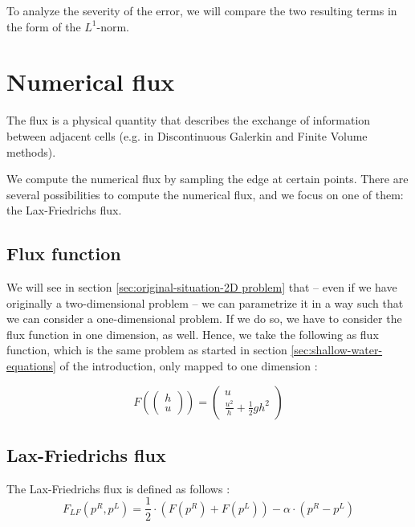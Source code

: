 \documentclass[a4paper, twoside]{article}
\begin{document}
To analyze the severity of the error, we will compare the two resulting terms in the form of the $L^1$-norm.

\section{Numerical flux}
\label{sec:numerical-flux}

The flux is a physical quantity that describes the exchange of information between adjacent cells (e.g. in Discontinuous Galerkin and Finite Volume methods).

We compute the numerical flux by sampling the edge at certain points. There are several possibilities to compute the numerical flux, and we focus on one of them: the Lax-Friedrichs flux.

\subsection{Flux function}
\label{sec:flux-function-intro}

We will see in section \ref{sec:original-situation-2D problem} that -- even if we have originally a two-dimensional problem -- we can parametrize it in a way such that we can consider a one-dimensional problem. If we do so, we have to consider the flux function in one dimension, as well. Hence, we take the following as flux function, which is the same problem as started in section \ref{sec:shallow-water-equations} of the introduction, only mapped to one dimension \cite{george2004numerical}:

\begin{equation}
  \label{eq:flux-function-definition}
  F\left(
    \begin{pmatrix}
      h \\ u
    \end{pmatrix}
  \right) =
  \begin{pmatrix}
    u \\
    \frac{u^2}{h} + \frac{1}{2} g h^2
  \end{pmatrix}
\end{equation}

\subsection{Lax-Friedrichs flux}
\label{sec:lax-friedrich-definition}

The Lax-Friedrichs flux is defined as follows \cite{leveque2002finite}:
\begin{equation}
  \label{eq:lax-friedrich-definition}
  F_{LF}(p^R,p^L) = \dfrac{1}{2}\cdot (F(p^R) + F(p^L)) - \alpha \cdot (p^R - p^L)
\end{equation}
\end{document}
